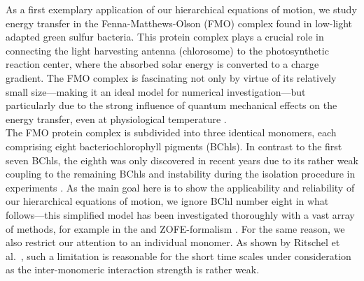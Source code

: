 As a first exemplary application of our hierarchical equations of motion, we study energy transfer in the Fenna-Matthews-Olson (FMO) complex found in low-light adapted green sulfur bacteria.
This protein complex plays a crucial role in connecting the light harvesting antenna (chlorosome) to the photosynthetic reaction center, where the absorbed solar energy is converted to a charge gradient.
The FMO complex is fascinating not only by virtue of its relatively small size---making it an ideal model for numerical investigation---but particularly due to the strong influence of quantum mechanical effects on the energy transfer, even at physiological temperature \cite{SaBuSt97_bchls,EnCaRe07_fmo}.\\




The FMO protein complex is subdivided into three identical monomers, each comprising eight bacteriochlorophyll pigments (BChls).
In contrast to the first seven BChls, the eighth was only discovered in recent years due to its rather weak coupling to the remaining BChls and instability during the isolation procedure in experiments \cite{TrCaBl09_fmo_structure}.
As the main goal here is to show the applicability and reliability of our hierarchical equations of motion, we ignore BChl number eight in what follows---this simplified model has been investigated thoroughly with a vast array of methods, for example in the \HEOM and \textsc{ZOFE}-formalism \cite{IsFl09_fmo,RiRoSt11_fmo}.
For the same reason, we also restrict our attention to an individual monomer.
As shown by Ritschel et al.\ \cite{RiRoSt11_fmo_trimer}, such a limitation is reasonable for the short time scales under consideration as the inter-monomeric interaction strength is rather weak.

